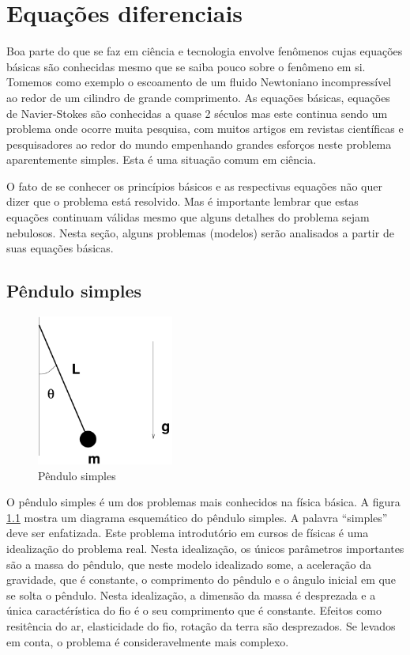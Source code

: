 \chapter{Equações diferenciais}
Boa parte do que se faz em ciência e tecnologia envolve fenômenos cujas equações básicas são conhecidas mesmo que se saiba pouco sobre o fenômeno em si. Tomemos como exemplo o escoamento de um fluido Newtoniano incompressível ao redor de um cilindro de grande comprimento. As equações básicas, equações de Navier-Stokes são conhecidas a quase 2 séculos mas este continua sendo um problema onde ocorre muita pesquisa, com muitos artigos em revistas científicas e pesquisadores ao redor do mundo empenhando grandes esforços neste problema aparentemente simples. Esta é uma situação comum em ciência. 

O fato de se conhecer os princípios básicos e as respectivas equações não quer dizer que o problema está resolvido. Mas é importante lembrar que estas equações continuam válidas mesmo que alguns detalhes do problema sejam nebulosos. Nesta seção, alguns problemas (modelos) serão analisados a partir de suas equações básicas.

\section{Pêndulo simples}

\begin{figure}
\centering
\includegraphics[width=0.4\textwidth]{./figuras/pendulo.pdf}
\vspace{0.5cm}
\caption{Pêndulo simples}
\label{fig:pendulo}
\end{figure}

O pêndulo simples é um dos problemas mais conhecidos na física básica. A figura \ref{fig:pendulo} mostra um diagrama esquemático do pêndulo simples. A palavra ``simples'' deve ser enfatizada. Este problema introdutório em cursos de físicas é uma idealização do problema real. Nesta idealização, os únicos parâmetros importantes são a massa do pêndulo, que neste modelo idealizado some, a aceleração da gravidade, que é constante, o comprimento do pêndulo e o ângulo inicial em que se solta o pêndulo. Nesta idealização, a dimensão da massa é desprezada e a única caractérística do fio é o seu comprimento que é constante. Efeitos como resitência do ar, elasticidade do fio, rotação da terra são desprezados. Se levados em conta, o problema é consideravelmente mais complexo. 

